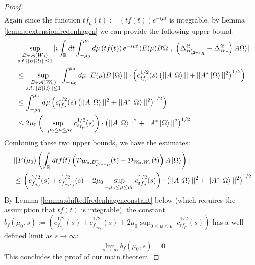 \documentclass[a4paper,11pt]{article}
\theoremstyle{definition}
\newcommand{\lb}{\left(}
\newcommand{\rb}{\right)}
\begin{document}
\begin{proof}
\begin{align}
    \end{align}
    Again since the function $tf_\mu(t):= \lb tf(t) \rb e^{-i\mu t}$ is integrable, by Lemma \ref{lemma:extensionfredenhagen} we can provide the following upper bound:
    \begin{align}
        \begin{split}
            &\sup_{\substack{B\in\mathcal{A}(W_0)\\s.t.||B\ket{\Omega}||\leq 1}}|i\int_\mathbb{R} dt \int_{-\mu_0}^{\mu_0}d\mu \lb tf(t)\rb e^{-i\mu t}\langle E(\mu)B\Omega\text{ , }\lb\Delta^{it}_{B^r_{e^{2\pi s}R}} - \Delta^{it}_{W_r}\rb A\Omega \rangle|
            \\&
            \leq \sup_{\substack{B\in\mathcal{A}(W_0)\\s.t.||B\ket{\Omega}||\leq 1}}\int_{-\mu_0}^{\mu_0}d\mu ||E(\mu)B\ket{\Omega}||\cdot\lb c^{1/2}_{t f_\mu}(s)\lb||A\ket{\Omega}|| + ||A^*\ket{\Omega}||^2\rb^{1/2}\rb
            \\&
            \leq \int_{-\mu_0}^{\mu_0}d\mu \lb c^{1/2}_{tf_\mu}(s)\lb||A\ket{\Omega}||^2 + ||A^*\ket{\Omega}||^2\rb^{1/2}\rb 
            \\&
            \leq 2\mu_0\lb\sup_{-\mu_0\leq \mu\leq \mu_0}c^{1/2}_{tf_\mu}(s)\rb\cdot\lb||A\ket{\Omega}||^2 + ||A^*\ket{\Omega}||^2\rb^{1/2}
        \end{split}
    \end{align}
    Combining these two upper bounds, we have the estimates:
    \begin{align}
        \begin{split}
            &||F(\mu_0)\lb\int_\mathbb{R} dt f(t)\lb\mathcal{D}_{W_0, B^r_{e^{2\pi s}R}}(t) - \mathcal{D}_{W_0, W_r}(t)\rb A\ket{\Omega}\rb||
            \\&
            \leq \lb c^{1/2}_{f_{\mu_0}}(s) + c^{1/2}_{f_{-\mu_0}}(s) + 2\mu_0\sup_{-\mu_0\leq \mu\leq \mu_0}c^{1/2}_{tf_\mu}(s) \rb\cdot\lb||A\ket{\Omega}||^2 + ||A^*\ket{\Omega}||^2\rb^{1/2}
        \end{split}
    \end{align}
    By Lemma \ref{lemma:shiftedfredenhagenconstant} below (which requires the assumption that $tf(t)$ is integrable), the constant $b_f(\mu_0, s) := \lb c^{1/2}_{f_{\mu_0}}(s) + c^{1/2}_{f_{-\mu_0}}(s) + 2\mu_0\sup_{0\leq \mu\leq \mu_0}c^{1/2}_{tf_\mu}(s)\rb$ has a well-defined limit as $s\rightarrow\infty$:
    \begin{equation}
        \lim_{s\rightarrow\infty}b_f(\mu_0, s) = 0
    \end{equation}
    This concludes the proof of our main theorem. 
\end{proof}
\end{document}
